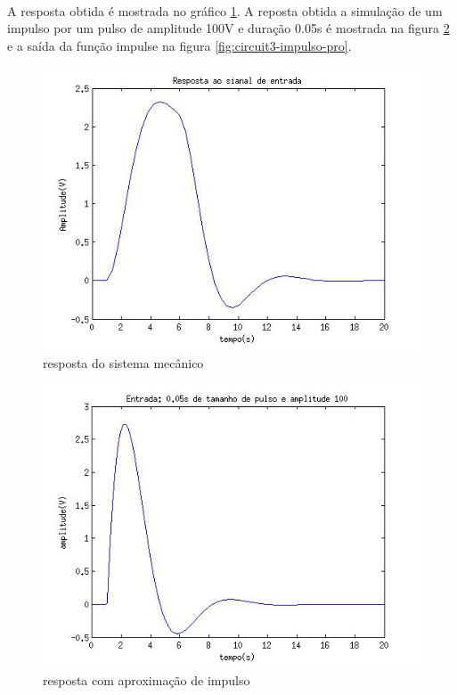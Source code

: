 \documentclass[a4paper,11pt]{article}
\begin{document}
\paragraph{}A resposta obtida é mostrada no gráfico \ref{fig:circuit3-saida}.
A reposta obtida a simulação de um impulso por um pulso de amplitude 100V e duração
0.05s é mostrada na figura \ref{fig:circuit3-impulso-simulado} e a saída da função impulse
na figura \ref{fig:circuit3-impulso-pro}.
\FloatBarrier
\begin{figure}[!htp]
		\centering
		\includegraphics[scale = 0.5]{./images/exerc3-saida.jpg}
		\caption{resposta do sistema mecânico}
		\label{fig:circuit3-saida}
\end{figure}
\begin{figure}[!htp]
		\centering
		\includegraphics[scale = 0.5]{./images/exerc3-saida-impulso-simulado.jpg}
		\caption{resposta com aproximação de impulso}
		\label{fig:circuit3-impulso-simulado}
\end{figure}
\end{document}

